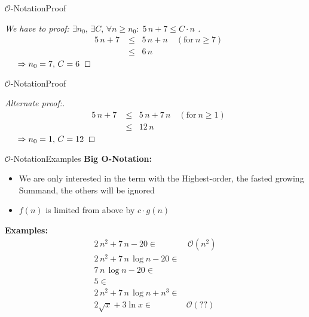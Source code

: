 
\begin{frame}{$\mathcal{O}$-Notation}{Proof}
  \begin{proof}[
    We have to proof:
    \begin{math}
      \exists n_0, \, \exists C, \, \forall n \geq n_0 \! : \;
        5 \, n + 7 \leq C \cdot n
    \end{math}
  ]
    \begin{eqnarray*}
      &5 \, n + 7 &\leq \;\; 5 \, n + n \hspace{1em} (\text{for} ~ n \geq 7)\\
      && \leq \;\; 6 \, n
    \end{eqnarray*}
    $\hspace{1.5em} \Rightarrow n_0 = 7, \, C = 6$ \qedhere
  \end{proof}
\end{frame}


\begin{frame}{$\mathcal{O}$-Notation}{Proof}
  \begin{proof}[Alternate proof:]
    \begin{eqnarray*}
      &5 \, n + 7 &\leq \;\; 5 \, n + 7 \, n \hspace{1em}
      (\text{for} ~ n \geq 1)\\
      && \leq \;\; 12 \, n
    \end{eqnarray*}
    $\hspace{1.5em} \Rightarrow n_0 = 1, \, C = 12$ \qedhere
  \end{proof}
\end{frame}


\begin{frame}{$\mathcal{O}$-Notation}{Examples}
  \textbf{Big O-Notation:}
  \begin{itemize}
    \item
      We are only interested in the term with the Highest-order, the fasted growing Summand,
      the others will be ignored
    \item
      $f(n)$ is limited {\color{Mittel-Blau}from above} by $c \cdot g(n)$
  \end{itemize}
  \textbf{Examples:}
  \begin{align*}
     2 \, n^2 + 7 \, n - 20 \in & \,\mathcal{O}(n^2) \\
     2 \, n^2 + 7 \, n \, \log n - 20 \in & {}\\
     7 \, n \, \log n - 20 \in & {}\\
     5 \in & {}\\
     2 \, n^2 + 7 \, n \, \log n + n^3 \in & {}\\
     2 \sqrt{x} + 3 \ln x \in & \mathcal{O} (??)
  \end{align*}
\end{frame}

